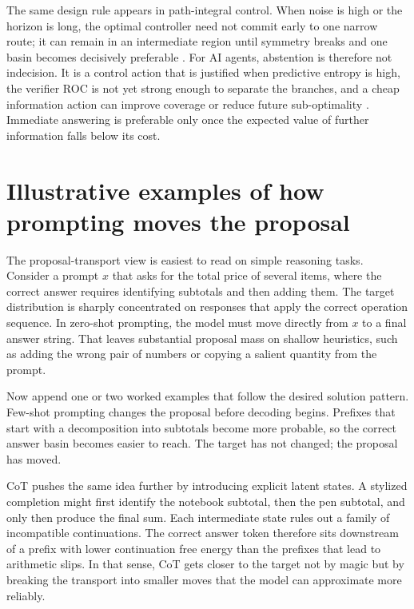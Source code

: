 \documentclass[aps,pre,reprint,superscriptaddress,nofootinbib]{revtex4-2}
\begin{document}
The same design rule appears in path-integral control.
 When noise is high or the horizon is long, the optimal controller need not commit early to one narrow route; it can remain in an intermediate region until symmetry breaks and one basin becomes decisively preferable \cite{kappen2005path}.
 For AI agents, abstention is therefore not indecision.
 It is a control action that is justified when predictive entropy is high, the verifier ROC is not yet strong enough to separate the branches, and a cheap information action can improve coverage or reduce future sub-optimality \cite{mukherjee2025test}.
 Immediate answering is preferable only once the expected value of further information falls below its cost.

\section{Illustrative examples of how prompting moves the proposal}

The proposal-transport view is easiest to read on simple reasoning tasks.
 Consider a prompt $x$ that asks for the total price of several items, where the correct answer requires identifying subtotals and then adding them.
 The target distribution is sharply concentrated on responses that apply the correct operation sequence.
 In zero-shot prompting, the model must move directly from $x$ to a final answer string.
 That leaves substantial proposal mass on shallow heuristics, such as adding the wrong pair of numbers or copying a salient quantity from the prompt.

Now append one or two worked examples that follow the desired solution pattern.
 Few-shot prompting changes the proposal before decoding begins.
 Prefixes that start with a decomposition into subtotals become more probable, so the correct answer basin becomes easier to reach.
 The target has not changed; the proposal has moved.

CoT pushes the same idea further by introducing explicit latent states.
 A stylized completion might first identify the notebook subtotal, then the pen subtotal, and only then produce the final sum.
 Each intermediate state rules out a family of incompatible continuations.
 The correct answer token therefore sits downstream of a prefix with lower continuation free energy than the prefixes that lead to arithmetic slips.
 In that sense, CoT gets closer to the target not by magic but by breaking the transport into smaller moves that the model can approximate more reliably.
\end{document}
